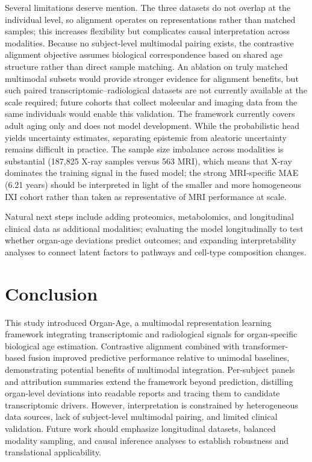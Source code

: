 \documentclass[10pt,twocolumn]{article}
\begin{document}
Several limitations deserve mention. The three datasets do not overlap at the individual level, so
alignment operates on representations rather than matched samples; this increases flexibility but
complicates causal interpretation across modalities. Because no subject-level multimodal pairing
exists, the contrastive alignment objective assumes biological correspondence based on shared age
structure rather than direct sample matching. An ablation on truly matched multimodal subsets would
provide stronger evidence for alignment benefits, but such paired transcriptomic--radiological
datasets are not currently available at the scale required; future cohorts that collect molecular
and imaging data from the same individuals would enable this validation. The framework currently
covers adult aging only and does not model development. While the probabilistic head yields
uncertainty estimates, separating epistemic from aleatoric uncertainty remains difficult in
practice. The sample size imbalance across modalities is substantial (187{,}825 X-ray samples
versus 563 MRI), which means that X-ray dominates the training signal in the fused model; the
strong MRI-specific MAE (6.21 years) should be interpreted in light of the smaller and more
homogeneous IXI cohort rather than taken as representative of MRI performance at scale.

Natural next steps include adding proteomics, metabolomics, and longitudinal clinical data as
additional modalities; evaluating the model longitudinally to test whether organ-age deviations
predict outcomes; and expanding interpretability analyses to connect latent factors to pathways and
cell-type composition changes.

\section{Conclusion}

This study introduced Organ-Age, a multimodal representation learning framework integrating
transcriptomic and radiological signals for organ-specific biological age estimation. Contrastive
alignment combined with transformer-based fusion improved predictive performance relative to
unimodal baselines, demonstrating potential benefits of multimodal integration. Per-subject panels
and attribution summaries extend the framework beyond prediction, distilling organ-level deviations
into readable reports and tracing them to candidate transcriptomic drivers. However, interpretation
is constrained by heterogeneous data sources, lack of subject-level multimodal pairing, and limited
clinical validation. Future work should emphasize longitudinal datasets, balanced modality sampling,
and causal inference analyses to establish robustness and translational applicability.



\end{document}
